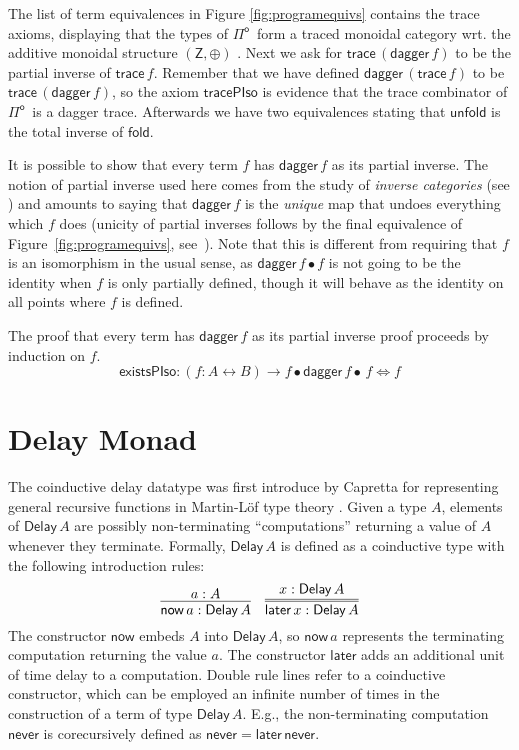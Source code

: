 \documentclass[runningheads,a4paper]{llncs}
\newcommand{\Pio}{\ensuremath{\mathsf{\Pi}^{\mathsf{o}}}}
\newcommand{\lr}{\longleftrightarrow}
\newcommand{\fold}{\mathsf{fold}}
\newcommand{\unfold}{\mathsf{unfold}}
\newcommand{\trace}{\ensuremath{\mathsf{trace}}}
\newcommand{\Z}{\mathsf{Z}}
\newcommand{\LR}{\iff}
\renewcommand{\dagger}{\mathsf{dagger}}
\newcommand{\Delay}{\ensuremath{\mathsf{Delay}\,}}
\newcommand{\now}{\mathsf{now}}
\newcommand{\later}{\mathsf{later}}
\newcommand{\never}{\mathsf{never}}
\begin{document}
The list of term equivalences in Figure \ref{fig:programequivs}
contains the trace axioms, displaying that the types of \Pio\ form a
traced monoidal category wrt. the additive monoidal structure
$(\Z,\oplus)$ \cite{JoyalSV96}. Next we ask for
$\trace\,(\dagger\,f)$ to be the partial inverse of
$\trace\,f$. Remember that we have defined $\dagger\,(\trace\,f)$ to
be $\trace\,(\dagger \,f)$, so the axiom $\mathsf{tracePIso}$
is evidence that the trace combinator of \Pio\ is a dagger trace.
Afterwards we have two equivalences stating that $\unfold$ is the
total inverse of $\fold$. 

It is possible to show that every term $f$ has $\dagger\,f$ as its partial
inverse. The notion of partial inverse used here comes from the study of
\emph{inverse categories} (see \cite{Kastl79}) and amounts to saying that
$\dagger\,f$ is the \emph{unique} map that undoes everything which $f$ does
(unicity of partial inverses follows by the final equivalence of
Figure~\ref{fig:programequivs}, see~\cite{Kastl79}). Note that this is
different from requiring that $f$ is an isomorphism in the usual sense, as
$\dagger\,f \bullet f$ is not going to be the identity when $f$ is only
partially defined, though it will behave as the identity on all points where
$f$ is defined.

The proof that every term has $\dagger\,f$ as its partial inverse proof
proceeds by induction on $f$.
\[
\mathsf{existsPIso} : (f : A \lr B) \to f \bullet \dagger\,f
\bullet\,f \LR f
\]


\section{Delay Monad}\label{sec:delay}

The coinductive delay datatype was first introduce by Capretta for
representing general recursive functions in Martin-L\"of type theory
\cite{Capretta05}.  Given a type $A$, elements of $\Delay A$ are
possibly non-terminating ``computations'' returning a value of $A$
whenever they terminate. Formally, $\Delay A$ is defined as a
coinductive type with the following introduction rules:
\[
\infer{\now\,a : \Delay A}{a : A}
\quad
\infer={\later\,x : \Delay A}{x : \Delay A}
\]
The constructor $\now$ embeds $A$ into $\Delay A$, so $\now\,a$
represents the terminating computation returning the value $a$. The
constructor $\later$ adds an additional unit of time delay to a
computation. Double rule lines refer to a coinductive constructor,
which can be employed an infinite number of times in the construction
of a term of type $\Delay A$.  E.g., the non-terminating computation
$\never$ is corecursively defined as $\never = \later \,\never$.
\end{document}
